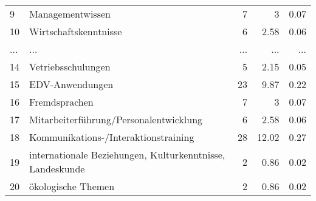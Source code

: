 \begin{longtable}{lXrrr}
        9 & \multicolumn{1}{X}{Managementwissen} & %
          \num{7} &
          \num[round-mode=places,round-precision=2]{3} &
          \num[round-mode=places,round-precision=2]{0,07} \\
        10 & \multicolumn{1}{X}{Wirtschaftskenntnisse} & %
          \num{6} &
          \num[round-mode=places,round-precision=2]{2,58} &
          \num[round-mode=places,round-precision=2]{0,06} \\
       ... & ... & ... & ... & ... \\
        14 & \multicolumn{1}{X}{Vetriebsschulungen} & %
          \num{5} &
          \num[round-mode=places,round-precision=2]{2,15} &
          \num[round-mode=places,round-precision=2]{0,05} \\

        15 & \multicolumn{1}{X}{EDV-Anwendungen} & %
          \num{23} &
          \num[round-mode=places,round-precision=2]{9,87} &
          \num[round-mode=places,round-precision=2]{0,22} \\

        16 & \multicolumn{1}{X}{Fremdsprachen} & %
          \num{7} &
          \num[round-mode=places,round-precision=2]{3} &
          \num[round-mode=places,round-precision=2]{0,07} \\

        17 & \multicolumn{1}{X}{Mitarbeiterführung/Personalentwicklung} & %
          \num{6} &
          \num[round-mode=places,round-precision=2]{2,58} &
          \num[round-mode=places,round-precision=2]{0,06} \\

        18 & \multicolumn{1}{X}{Kommunikations-/Interaktionstraining} & %
          \num{28} &
          \num[round-mode=places,round-precision=2]{12,02} &
          \num[round-mode=places,round-precision=2]{0,27} \\

        19 & \multicolumn{1}{X}{internationale Beziehungen, Kulturkenntnisse, Landeskunde} & %
          \num{2} &
          \num[round-mode=places,round-precision=2]{0,86} &
          \num[round-mode=places,round-precision=2]{0,02} \\

        20 & \multicolumn{1}{X}{ökologische Themen} & %
          \num{2} &
          \num[round-mode=places,round-precision=2]{0,86} &
          \num[round-mode=places,round-precision=2]{0,02} \\


\end{longtable}
